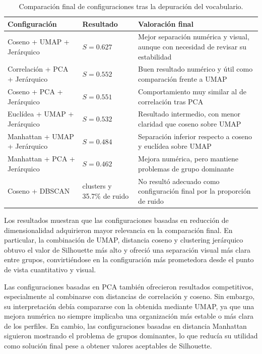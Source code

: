 \documentclass[11pt,spanish,listoffigures,listoftables]{tfgetsinf}
\begin{document}
\begin{table}[H]
\centering
\small
\renewcommand{\arraystretch}{1.25}
\begin{tabular}{
>{\centering\arraybackslash}m{}
>{\centering\arraybackslash}m{}
m{}
}
\hline
\textbf{Configuración} & \textbf{Resultado} & \textbf{Valoración final} \\
\hline
Coseno + UMAP + Jerárquico & \(S=0.627\) & Mejor separación numérica y visual, aunque con necesidad de revisar su estabilidad \\
\hline
Correlación + PCA + Jerárquico & \(S=0.552\) & Buen resultado numérico y útil como comparación frente a UMAP \\
\hline
Coseno + PCA + Jerárquico & \(S=0.551\) & Comportamiento muy similar al de correlación tras PCA \\
\hline
Euclídea + UMAP + Jerárquico & \(S=0.532\) & Resultado intermedio, con menor claridad que coseno sobre UMAP \\
\hline
Manhattan + UMAP + Jerárquico & \(S=0.484\) & Separación inferior respecto a coseno y euclídea sobre UMAP \\
\hline
Manhattan + PCA + Jerárquico & \(S=0.462\) & Mejora numérica, pero mantiene problemas de grupo dominante \\
\hline
Coseno + DBSCAN & 2 clusters y 35.7\% de ruido & No resultó adecuado como configuración final por la proporción de ruido \\
\hline
\end{tabular}
\caption{Comparación final de configuraciones tras la depuración del vocabulario.}
\label{tab:comparacion_final_configuraciones}
\end{table}

Los resultados muestran que las configuraciones basadas en reducción de dimensionalidad adquirieron mayor relevancia en la comparación final. En particular, la combinación de UMAP, distancia coseno y clustering jerárquico obtuvo el valor de Silhouette más alto y ofreció una separación visual más clara entre grupos, convirtiéndose en la configuración más prometedora desde el punto de vista cuantitativo y visual.

Las configuraciones basadas en PCA también ofrecieron resultados competitivos, especialmente al combinarse con distancias de correlación y coseno. Sin embargo, su interpretación debía compararse con la obtenida mediante UMAP, ya que una mejora numérica no siempre implicaba una organización más estable o más clara de los perfiles. En cambio, las configuraciones basadas en distancia Manhattan siguieron mostrando el problema de grupos dominantes, lo que reducía su utilidad como solución final pese a obtener valores aceptables de Silhouette.
\end{document}

